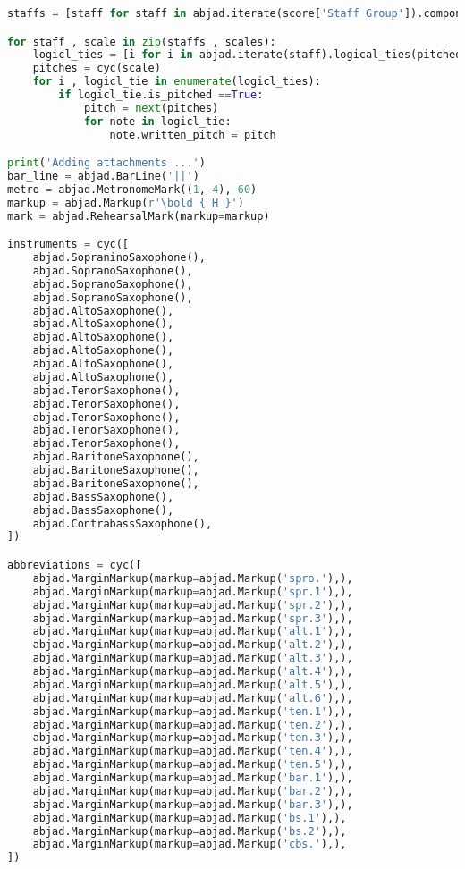 \begin{lstlisting}[language=Python, caption=Invocation Source Code]
staffs = [staff for staff in abjad.iterate(score['Staff Group']).components(abjad.Staff)]

for staff , scale in zip(staffs , scales):
    logicl_ties = [i for i in abjad.iterate(staff).logical_ties(pitched=True)]
    pitches = cyc(scale)
    for i , logicl_tie in enumerate(logicl_ties):
        if logicl_tie.is_pitched ==True:
            pitch = next(pitches)
            for note in logicl_tie:
                note.written_pitch = pitch

print('Adding attachments ...')
bar_line = abjad.BarLine('||')
metro = abjad.MetronomeMark((1, 4), 60)
markup = abjad.Markup(r'\bold { H }')
mark = abjad.RehearsalMark(markup=markup)

instruments = cyc([
    abjad.SopraninoSaxophone(),
    abjad.SopranoSaxophone(),
    abjad.SopranoSaxophone(),
    abjad.SopranoSaxophone(),
    abjad.AltoSaxophone(),
    abjad.AltoSaxophone(),
    abjad.AltoSaxophone(),
    abjad.AltoSaxophone(),
    abjad.AltoSaxophone(),
    abjad.AltoSaxophone(),
    abjad.TenorSaxophone(),
    abjad.TenorSaxophone(),
    abjad.TenorSaxophone(),
    abjad.TenorSaxophone(),
    abjad.TenorSaxophone(),
    abjad.BaritoneSaxophone(),
    abjad.BaritoneSaxophone(),
    abjad.BaritoneSaxophone(),
    abjad.BassSaxophone(),
    abjad.BassSaxophone(),
    abjad.ContrabassSaxophone(),
])

abbreviations = cyc([
    abjad.MarginMarkup(markup=abjad.Markup('spro.'),),
    abjad.MarginMarkup(markup=abjad.Markup('spr.1'),),
    abjad.MarginMarkup(markup=abjad.Markup('spr.2'),),
    abjad.MarginMarkup(markup=abjad.Markup('spr.3'),),
    abjad.MarginMarkup(markup=abjad.Markup('alt.1'),),
    abjad.MarginMarkup(markup=abjad.Markup('alt.2'),),
    abjad.MarginMarkup(markup=abjad.Markup('alt.3'),),
    abjad.MarginMarkup(markup=abjad.Markup('alt.4'),),
    abjad.MarginMarkup(markup=abjad.Markup('alt.5'),),
    abjad.MarginMarkup(markup=abjad.Markup('alt.6'),),
    abjad.MarginMarkup(markup=abjad.Markup('ten.1'),),
    abjad.MarginMarkup(markup=abjad.Markup('ten.2'),),
    abjad.MarginMarkup(markup=abjad.Markup('ten.3'),),
    abjad.MarginMarkup(markup=abjad.Markup('ten.4'),),
    abjad.MarginMarkup(markup=abjad.Markup('ten.5'),),
    abjad.MarginMarkup(markup=abjad.Markup('bar.1'),),
    abjad.MarginMarkup(markup=abjad.Markup('bar.2'),),
    abjad.MarginMarkup(markup=abjad.Markup('bar.3'),),
    abjad.MarginMarkup(markup=abjad.Markup('bs.1'),),
    abjad.MarginMarkup(markup=abjad.Markup('bs.2'),),
    abjad.MarginMarkup(markup=abjad.Markup('cbs.'),),
])


\end{lstlisting}
